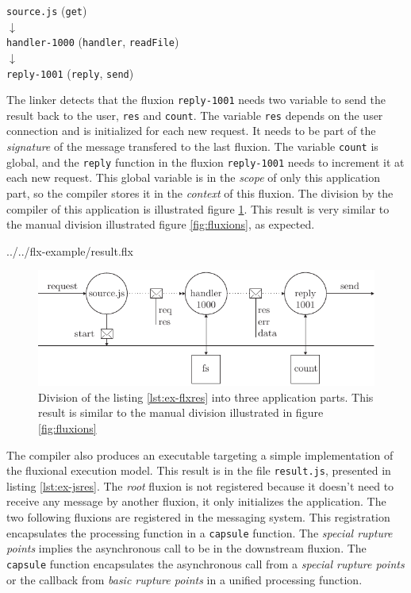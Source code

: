 \begin{center}
\texttt{source.js} (\texttt{get})\\
$\downarrow$\\
\texttt{handler-1000} (\texttt{handler}, \texttt{readFile})\\
$\downarrow$\\
\texttt{reply-1001} (\texttt{reply}, \texttt{send})
\end{center}

The linker detects that the fluxion \texttt{reply-1001} needs two variable to send the result back to the user, \texttt{res} and \texttt{count}.
The variable \texttt{res} depends on the user connection and is initialized for each new request.
It needs to be part of the \textit{signature} of the message transfered to the last fluxion.
The variable \texttt{count} is global, and the \texttt{reply} function in the fluxion \texttt{reply-1001} needs to increment it at each new request.
This global variable is in the \textit{scope} of only this application part, so the compiler stores it in the \textit{context} of this fluxion.
The division by the compiler of this application is illustrated figure \ref{fig:flux-3}.
This result is very similar to the manual division illustrated figure \ref{fig:fluxions}, as expected.

{../../flx-example/result.flx}

\begin{figure}[h!]
\begin{center}
  \includegraphics[width=\linewidth]{ressources/flux-3.pdf}
  \caption{Division of the listing \ref{lst:ex-flxres} into three application parts. This result is similar to the manual division illustrated in figure \ref{fig:fluxions}}
  \label{fig:flux-3}
\end{center}
\end{figure}

The compiler also produces an executable targeting a simple implementation of the fluxional execution model.
This result is in the file \texttt{result.js}, presented in listing \ref{lst:ex-jsres}.
The \textit{root} fluxion is not registered because it doesn't need to receive any message by another fluxion, it only initializes the application.
The two following fluxions are registered in the messaging system.
This registration encapsulates the processing function in a \texttt{capsule} function.
The \textit{special rupture points} implies the asynchronous call to be in the downstream fluxion.
The \texttt{capsule} function encapsulates the asynchronous call from a \textit{special rupture points} or the callback from \textit{basic rupture points} in a unified processing function.

